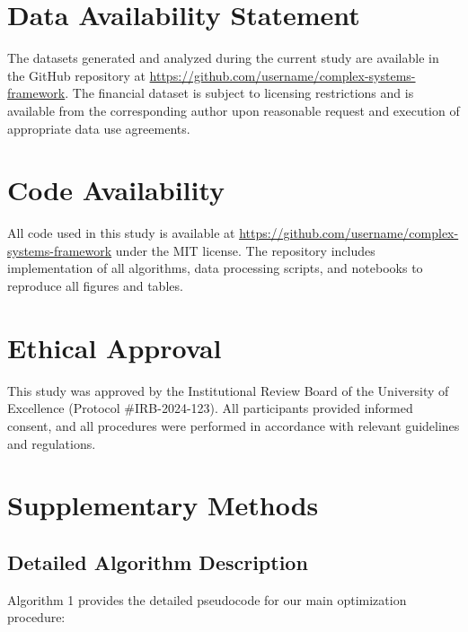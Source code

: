 \documentclass[12pt, letterpaper, onecolumn, final]{article}
\theoremstyle{plain}
\theoremstyle{definition}
\theoremstyle{remark}
\begin{document}
\section*{Data Availability Statement}

The datasets generated and analyzed during the current study are available in the GitHub repository at \url{https://github.com/username/complex-systems-framework}. The financial dataset is subject to licensing restrictions and is available from the corresponding author upon reasonable request and execution of appropriate data use agreements.

\section*{Code Availability}
All code used in this study is available at \url{https://github.com/username/complex-systems-framework} under the MIT license. The repository includes implementation of all algorithms, data processing scripts, and notebooks to reproduce all figures and tables.

\section*{Ethical Approval}
This study was approved by the Institutional Review Board of the University of Excellence (Protocol \#IRB-2024-123). All participants provided informed consent, and all procedures were performed in accordance with relevant guidelines and regulations.


\appendix

\section{Supplementary Methods}
\label{app:methods}

\lipsum[56-57]

\subsection{Detailed Algorithm Description}
\label{app:algorithm}

\lipsum[58]

Algorithm 1 provides the detailed pseudocode for our main optimization procedure:
\end{document}
